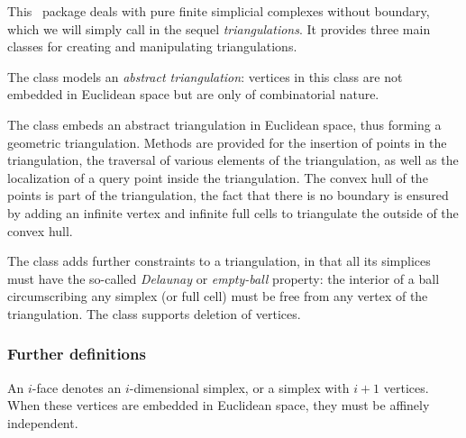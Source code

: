 This \cgal\ package deals with pure finite simplicial complexes
without boundary, which
we will simply call in the sequel {\em triangulations}. It provides three main classes
for creating and manipulating triangulations.

The class  models an {\em abstract triangulation}: vertices in this
class are not embedded in Euclidean space but are only of combinatorial
nature.

The class  embeds an abstract
triangulation in Euclidean space, thus forming a geometric
triangulation. Methods are
provided for the insertion %
of points in the triangulation, the
traversal of various elements of the triangulation, as well as the localization of a
query point inside the triangulation.
The convex hull of the points is part of the triangulation, the fact
that there is no boundary is ensured by adding an infinite vertex and
infinite full cells to triangulate the outside of the convex hull.

The class  adds further
constraints to a triangulation, in that all its simplices must have the
so-called {\em Delaunay} or {\em empty-ball} property: the interior of
a ball circumscribing any simplex (or full cell) must be free from any
vertex of the triangulation. The  class
supports deletion of vertices.




\subsubsection{Further definitions}

An $i$-face denotes an $i$-dimensional simplex, or a simplex with $i+1$
vertices. When these vertices are embedded in Euclidean space, they must be
affinely independent.

